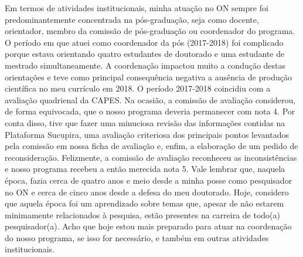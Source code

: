 Em termos de atividades institucionais, minha atuação no ON sempre foi predominantemente
concentrada na pós-graduação, seja como docente, orientador, membro da comissão de 
pós-graduação ou coordenador do programa.
O período em que atuei como coordenador da pós (2017-2018) foi complicado porque estava
orientando quatro estudantes de doutorado e uma estudante de mestrado simultaneamente. 
A coordenação impactou muito a condução destas orientações e teve como principal
consequência negativa a ausência de produção científica no meu currículo em 2018. 
O período 2017-2018 coincidiu com a avaliação quadrienal da CAPES.
Na ocasião, a comissão de avaliação considerou, de forma equivocada, que o nosso programa 
deveria permanecer com nota 4. Por conta disso, tive que fazer uma 
minuciosa revisão das informações contidas na Plataforma Sucupira, 
uma avaliação criteriosa dos principais pontos levantados pela comissão em nossa 
ficha de avaliação e, enfim, a elaboração de um pedido de reconsideração. 
Felizmente, a comissão de avaliação reconheceu as inconsistências e nosso programa 
recebeu a então merecida nota 5. Vale lembrar que, naquela época, fazia cerca de quatro anos 
e meio desde a minha posse como pesquisador no ON e cerca de cinco anos desde a defesa do 
meu doutorado.
Hoje, considero que aquela época foi um aprendizado sobre temas que, apesar de não
estarem minimamente relacionados à pesquisa, estão presentes na carreira de todo(a)
pesquisador(a). Acho que hoje estou mais preparado para atuar na coordenação do nosso
programa, se isso for necessário, e também em outras atividades institucionais.